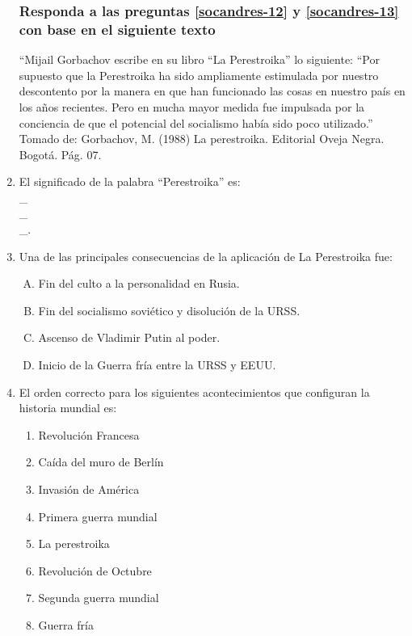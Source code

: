 \begin{enumerate}
\subsubsection*{Responda a las preguntas \ref{socandres-12} y \ref{socandres-13} con base en el siguiente texto}

``Mijail Gorbachov escribe en su libro ``La Perestroika'' lo siguiente: ``Por supuesto que la Perestroika ha sido ampliamente estimulada por nuestro descontento por la manera en que han funcionado las cosas en nuestro país en los años recientes. Pero en mucha mayor medida fue impulsada por la conciencia de que el potencial del socialismo había sido poco utilizado.''\\
{\footnotesize Tomado de: Gorbachov, M. (1988) La perestroika. Editorial Oveja Negra. Bogotá. Pág. 07.}

\item El significado de la palabra ``Perestroika'' es: \label{socandres-12} \hrulefill\\
\_\hrulefill\\
\_\hrulefill\\
\_\hrulefill.


\newpage
\item Una de las principales consecuencias de la aplicación de La Perestroika fue: \label{socandres-13}

\begin{enumerate}[(A)]
\item Fin del culto a la personalidad en Rusia.
\item Fin del socialismo soviético y disolución de la URSS.
\item Ascenso de Vladimir Putin al poder.
\item Inicio de la Guerra fría entre la URSS y EEUU.
\end{enumerate}


\item El orden correcto para los siguientes acontecimientos que configuran la historia mundial es: \label{socandres-14}


\begin{enumerate}[1.]
\item Revolución Francesa
\item Caída del muro de Berlín 
\item Invasión de América
\item Primera guerra mundial
\item La perestroika
\item Revolución de Octubre
\item Segunda guerra mundial
\item Guerra fría
\end{enumerate}


\end{enumerate}
